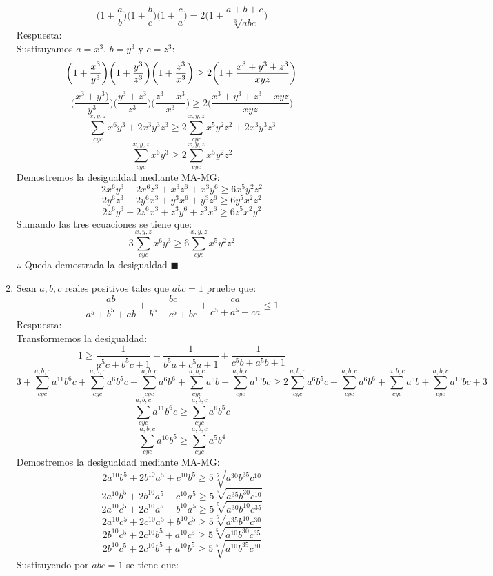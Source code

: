 \documentclass{book}
\begin{document}
\begin{enumerate}
          $$\bigg(1+\frac{a}{b}\bigg)\bigg(1+\frac{b}{c}\bigg)\bigg(1+\frac{c}{a}\bigg)=2\bigg(1+\frac{a+b+c}{\sqrt[3]{abc}}\bigg)$$
          Respuesta:\\
          Sustituyamos $a=x^3$, $b=y^3$ y $c=z^3$:
          $$\bigg(1+{x^3\over y^3} \bigg)\bigg(1+{y^3\over z^3} \bigg)\bigg(1+{z^3\over x^3} \bigg)\geq 2\bigg(1+\frac{x^3+y^3+z^3}{xyz}\bigg)$$
          $$\bigg(\frac{x^3+y^3)}{y^3} \bigg)\bigg(\frac{y^3+z^3}{z^3} \bigg)\bigg(\frac{z^3+x^3}{x^3} \bigg)\geq 2\bigg(\frac{x^3+y^3+z^3+xyz}{xyz}\bigg)$$
          $$\sum_{cyc}^{x,y,z}x^6 y^3+2x^3 y^3 z^3\geq 2\sum_{cyc}^{x,y,z}x^5 y^2 z^2 +2x^3 y^3 z^3$$
          $$\sum_{cyc}^{x,y,z}x^6 y^3\geq 2\sum_{cyc}^{x,y,z}x^5 y^2 z^2 $$
          Demostremos la desigualdad mediante MA-MG:
          $$2x^6 y^3+2x^6 z^3+x^3 z^6+x^3 y^6\geq 6x^5 y^2 z^2$$
          $$2y^6 z^3+2y^6 x^3+y^3 x^6+y^3 z^6\geq 6y^5 x^2 z^2$$
          $$2z^6 y^3+2z^6 x^3+z^3 y^6+z^3 x^6\geq 6z^5 x^2 y^2$$
          Sumando las tres ecuaciones se tiene que:
          $$3\sum_{cyc}^{x,y,z}x^6 y^3\geq 6\sum_{cyc}^{x,y,z}x^5 y^2 z^2$$
          $\therefore$ Queda demostrada la desigualdad $\blacksquare$\\
    \item Sean $a,b,c$ reales positivos tales que $abc=1$ pruebe que:
          $$\frac{ab}{a^5+b^5+ab}+\frac{bc}{b^5+c^5+bc}+\frac{ca}{c^5+a^5+ca}\leq 1$$
          Respuesta:\\
          Transformemos la desigualdad:
          $$1\geq\frac{1}{a^5 c+b^5 c+1}+\frac{1}{b^5 a+c^5 a+1}+\frac{1}{c^5 b+a^5 b+1}$$
          $$3+\sum_{cyc}^{a,b,c}a^{11} b^6 c+\sum_{cyc}^{a,b,c}a^6 b^5 c+\sum_{cyc}^{a,b,c}a^6 b^6+\sum_{cyc}^{a,b,c}a^5 b+\sum_{cyc}^{a,b,c}a^{10} bc\geq 2\sum_{cyc}^{a,b,c}a^6 b^5c+\sum_{cyc}^{a,b,c}a^6 b^6 +\sum_{cyc}^{a,b,c}a^5 b+\sum_{cyc}^{a,b,c}a^{10} bc+3$$
          $$\sum_{cyc}^{a,b,c}a^{11} b^6 c\geq\sum_{cyc}^{a,b,c}a^6 b^5c$$
          $$\sum_{cyc}^{a,b,c}{a^{10} b^5}\geq\sum_{cyc}^{a,b,c}a^5 b^4 $$
          Demostremos la desigualdad mediante MA-MG:
          $$2 a^{10}b^5 +2 b^{10}a^5 +c^{10}b^5 \geq 5 \sqrt[5]{ a^{30}b^{35}c^{10}}$$
          $$2 a^{10}b^5 +2 b^{10}a^5 +c^{10}a^5 \geq 5 \sqrt[5]{ a^{35}b^{30}c^{10}}$$
          $$2 a^{10}c^5 +2 c^{10}a^5 +b^{10}a^5 \geq 5 \sqrt[5]{ a^{30}b^{10}c^{35}}$$
          $$2 a^{10}c^5 +2 c^{10}a^5 +b^{10}c^5 \geq 5 \sqrt[5]{ a^{35}b^{10}c^{30}} $$
          $$2 b^{10}c^5 +2 c^{10}b^5 +a^{10}c^5 \geq 5 \sqrt[5]{ a^{10}b^{30}c^{35}} $$
          $$2 b^{10}c^5 +2 c^{10}b^5 +a^{10}b^5 \geq 5 \sqrt[5]{ a^{10}b^{35}c^{30}}$$
          Sustituyendo por $abc=1$ se tiene que:

\end{enumerate}
\end{document}
